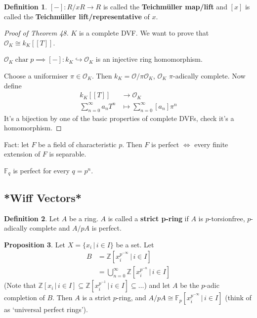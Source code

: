\documentclass[a4paper]{article}
\theoremstyle{definition}
\newtheorem{definition}{Definition}
\theoremstyle{default}
\newtheorem{prop}[definition]{Proposition}
\theoremstyle{remark}
\DeclareMathOperator{\characteristic}{char}
\begin{document}
\begin{definition}
	$[-]:R/xR \to R$ is called the \textbf{Teichm\"uller map/lift}
	and $[x]$ is called the \textbf{Teichm\"uller lift/representative} of $x$.
\end{definition}
\begin{proof}[Proof of Theorem 48]
	$K$ is a complete DVF.
	We want to prove that $\mathcal{O}_K \cong k_K[[T]]$.
	
	$\mathcal{O}_K \characteristic p \implies [-]:k_K \hookrightarrow \mathcal{O}_K$ is an injective ring homomorphism.
	
	Choose a uniformiser $\pi \in \mathcal{O}_K$. Then
	$k_K = \mathcal{O}/\pi\mathcal{O}_K$, $\mathcal{O}_K$ $\pi$-adically complete.
	Now define
	\begin{align*}
		k_K[[T]] &\to \mathcal{O}_K \\
		\sum_{n=0}^\infty a_n T^n &\mapsto \sum_{n=0}^\infty [a_n] \pi^n
	\end{align*}
	It's a bijection by one of the basic properties of complete DVFs, check it's a homomorphism.
\end{proof}

Fact: let $F$ be a field of characteristic $p$. Then $F$ is perfect $\iff$ every finite extension of $F$ is separable.

$\mathbb{F}_q$ is perfect for every $q=p^n$.

\subsection{*Wiff Vectors*}

\begin{definition}
	Let $A$ be a ring. $A$ is called a \textbf{strict p-ring} if $A$ is $p$-torsionfree,
	$p$-adically complete and $A/pA$ is perfect.
\end{definition}

\begin{prop}
	Let $X = \{x_i \,|\, i \in I\}$ be a set.
	Let
	\begin{align*}
	B &= \mathbb{Z}[x_i^{p^{-\infty}} \,|\, i \in I]\\
	&= \bigcup_{n=0}^\infty \mathbb{Z}[x_i^{p^{-n}} \,|\, i \in I]
	\end{align*}
	(Note that $\mathbb{Z}[x_i \,|\, i \in I] \subseteq \mathbb{Z}[x_i^{p^{-1}} \,|\, i \in I] \subseteq \dots$)
	and let $A$ be the $p$-adic completion of $B$. Then $A$ is a strict $p$-ring,
	and $A/pA \cong \mathbb{F}_p[x_i^{p^{-\infty}} \,|\, i \in I]$ (think of as `universal perfect rings').
\end{prop}
\end{document}
